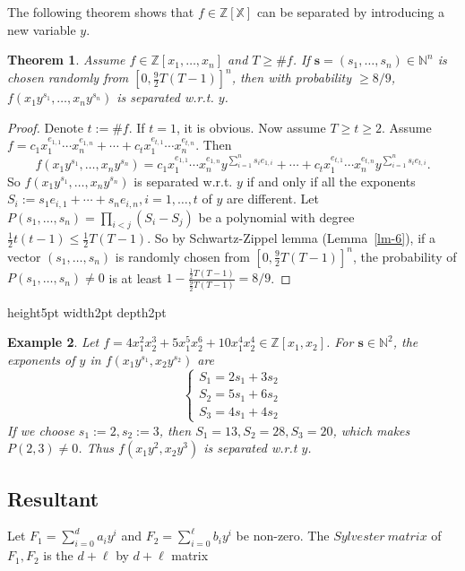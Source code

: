 \documentclass[final,20pt]{elsarticle}
\newtheorem{theorem}{Theorem}[section]
\newtheorem{example}[theorem]{Example}
\def\N{{\mathbb N}}
\def\Z{{\mathbb Z}}
\def\X{{\mathbb{X}}}
\def\qed{\hfil {\vrule height5pt width2pt depth2pt}}
\begin{document}
The following theorem shows that $f\in\mathbb{Z}[\X]$ can be separated by introducing a new variable $y$.

\begin{theorem}\label{the-1}
Assume $f\in \Z[x_1,\dots,x_n]$ and $T\geq \#f$. If $\mathbf{s}=(s_1,\dots,s_n)\in\N^n$ is chosen randomly from $[0,\frac92T(T-1)]^n$, then with probability $\geq 8/9$, $f(x_1y^{s_1},\dots,x_ny^{s_n})$ is separated w.r.t. $y$.
\end{theorem}

\begin{proof}
Denote $t:=\# f$. If $t=1$, it is obvious. Now assume $T\geq t\geq 2$. Assume $f=c_1x_1^{e_{1,1}}\cdots x_n^{e_{1,n}}+\cdots+c_tx_1^{e_{t,1}}\cdots x_n^{e_{t,n}}$. Then
$$f(x_1y^{s_1},\dots,x_ny^{s_n})=c_1x_1^{e_{1,1}}\cdots x_n^{e_{1,n}}y^{\sum_{i=1}^ns_ie_{1,i}}+\cdots+c_tx_1^{e_{t,1}}\cdots x_n^{e_{t,n}}y^{\sum_{i=1}^ns_ie_{t,i}}.$$
So $f(x_1y^{s_1},\dots,x_ny^{s_n})$ is separated w.r.t. $y$ if and only if all the exponents $S_i:=s_1e_{i,1}+\cdots+s_ne_{i,n},i=1,\dots,t$ of $y$ are different.
%
Let $P(s_1,\dots,s_n)=\prod_{i<j}(S_i-S_j)$ be a polynomial with degree $\frac12t(t-1)\leq \frac 12T(T-1)$.
%
So by Schwartz-Zippel lemma (Lemma~\ref{lm-6}), if a vector $(s_1,\dots,s_n)$ is randomly chosen from $[0,\frac92T(T-1)]^n$, the probability of $P(s_1,\dots,s_n)\neq 0$ is at least $1-\frac{\frac12T(T-1)}{\frac92T(T-1)}=8/9$.
\end{proof}\qed


\begin{example}
\label{ex-11}
Let $f=4x_1^2x_2^3+5x_1^5x_2^6+10x_1^4x_2^4\in\Z[x_1,x_2]$. For $\mathbf{s}\in \N^2$, the exponents of $y$ in $f(x_1y^{s_1},x_2y^{s_2})$ are
%
\[
\begin{cases}
S_1=2s_1+3s_2\\
S_2=5s_1+6s_2\\
S_3=4s_1+4s_2
\end{cases}
\]
If we choose $s_1:=2,s_2:=3$, then $S_1=13,S_2=28,S_3=20$, which makes $P(2,3)\neq 0$. Thus $f(x_1y^2,x_2y^3)$ is separated w.r.t $y$.
\end{example}



\subsection{Resultant}
Let $F_1=\sum_{i=0}^{d}a_iy^i$ and $F_2=\sum_{i=0}^{\ell} b_iy^i$ be non-zero. The $Sylvester\ matrix$ of $F_1,F_2$ is the $d+\ell$ by $d+\ell$ matrix
\end{document}
